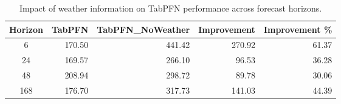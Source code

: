\begin{table}[h]
\centering
\begin{tabular}{crrrr}
\toprule
Horizon & TabPFN & TabPFN\_NoWeather & Improvement & Improvement \% \\
\midrule
6 & 170.50 & 441.42 & 270.92 & 61.37 \\
24 & 169.57 & 266.10 & 96.53 & 36.28 \\
48 & 208.94 & 298.72 & 89.78 & 30.06 \\
168 & 176.70 & 317.73 & 141.03 & 44.39 \\
\bottomrule
\end{tabular}
\caption{Impact of weather information on TabPFN performance across forecast horizons.}
\label{tab:tabpfn_weather}
\end{table}
